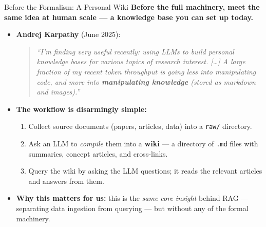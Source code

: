 \begin{frame}{Before the Formalism: A Personal Wiki}
\textbf{Before the full machinery, meet the same idea at human scale --- a knowledge base you can set up today.}

\medskip
\begin{itemize}
\item \textbf{Andrej Karpathy} (June 2025):
\begin{quote}
\small\itshape
``I'm finding very useful recently: using LLMs to build personal knowledge bases for various topics of research interest. \textnormal{[\ldots]} A large fraction of my recent token throughput is going less into manipulating code, and more into \textbf{manipulating knowledge} (stored as markdown and images).''
\end{quote}

\medskip
\item \textbf{The workflow is disarmingly simple:}
\begin{enumerate}
    \item Collect source documents (papers, articles, data) into a \texttt{raw/} directory.
    \item Ask an LLM to \emph{compile} them into a \textbf{wiki} --- a directory of \texttt{.md} files with summaries, concept articles, and cross-links.
    \item Query the wiki by asking the LLM questions; it reads the relevant articles and answers from them.
\end{enumerate}

\medskip
\item \textbf{Why this matters for us:} this is the \emph{same core insight} behind RAG --- separating data ingestion from querying --- but without any of the formal machinery.
\end{itemize}
\end{frame}

